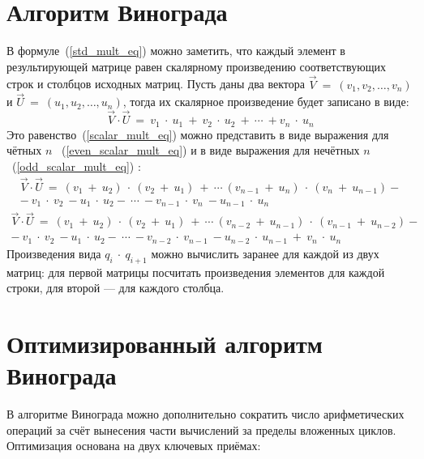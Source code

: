 \section{Алгоритм Винограда}
В формуле~(\ref{std_mult_eq}) можно заметить, что каждый элемент в результирующей матрице равен скалярному произведению соответствующих строк и столбцов исходных матриц.
Пусть даны два вектора $\overrightarrow{V}~=~(v_1, v_2, \dots, v_n)$ и $\overrightarrow{U}~=~(u_1, u_2, \dots, u_n)$, тогда их скалярное произведение будет записано в виде:
\begin{equation}
	\label{scalar_mult_eq}
	\overrightarrow{V}\cdot\overrightarrow{U}~=~v_1~\cdot~u_1~+~v_2~\cdot~u_2~+~\cdots~+v_n~\cdot~u_n
\end{equation}
Это равенство~(\ref{scalar_mult_eq}) можно представить в виде выражения для чётных $n$ ~(\ref{even_scalar_mult_eq})  и в виде выражения для нечётных $n$ ~(\ref{odd_scalar_mult_eq}) :
\begin{equation}
	\label{even_scalar_mult_eq}
	\begin{matrix}
		\overrightarrow{V}\cdot\overrightarrow{U}~=~(v_1~+~u_2)~\cdot~(v_2~+~u_1)~+~\cdots~(v_{n-1}~+~u_{n})~\cdot~(v_{n}~+~u_{n-1})- \\ -~v_1~\cdot~v_2~-u_1~\cdot~u_2-~\cdots~-v_{n-1}~\cdot~v_{n}~-u_{n-1}~\cdot~u_{n}
	\end{matrix}
\end{equation}
\begin{equation}
	\label{odd_scalar_mult_eq}
	\begin{matrix}
		\overrightarrow{V}\cdot\overrightarrow{U}~=~(v_1~+~u_2)~\cdot~(v_2~+~u_1)~+~\cdots~(v_{n-2}~+~u_{n-1})~\cdot~(v_{n-1}~+~u_{n-2})-\\  -~v_1~\cdot~v_2~-u_1~\cdot~u_2-~\cdots~-v_{n-2}~\cdot~v_{n-1}~-u_{n-2}~\cdot~u_{n-1}~+~v_n~\cdot~u_n
	\end{matrix}
\end{equation}
Произведения вида $q_{i}~\cdot~q_{i+1}$ можно вычислить заранее для каждой из двух матриц: для первой матрицы посчитать произведения элементов для каждой строки, для второй --- для каждого столбца.


\section{Оптимизированный алгоритм Винограда}
В алгоритме Винограда можно дополнительно сократить число арифметических операций за счёт вынесения части вычислений за пределы вложенных циклов. 
Оптимизация основана на двух ключевых приёмах:

